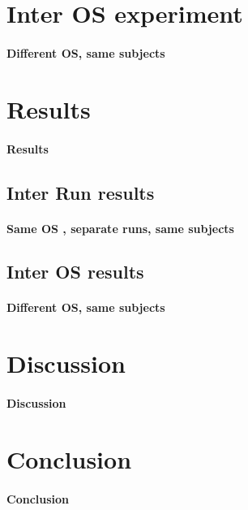 \section{Inter OS experiment}
\paragraph{Different OS, same subjects}


\section{Results}
\paragraph{Results}

\subsection{Inter Run results}
\paragraph{Same  OS , separate runs, same subjects}

\subsection{Inter OS results}
\paragraph{Different OS, same subjects}

\section{Discussion}
\paragraph{Discussion}

\section{Conclusion}
\paragraph{Conclusion}




